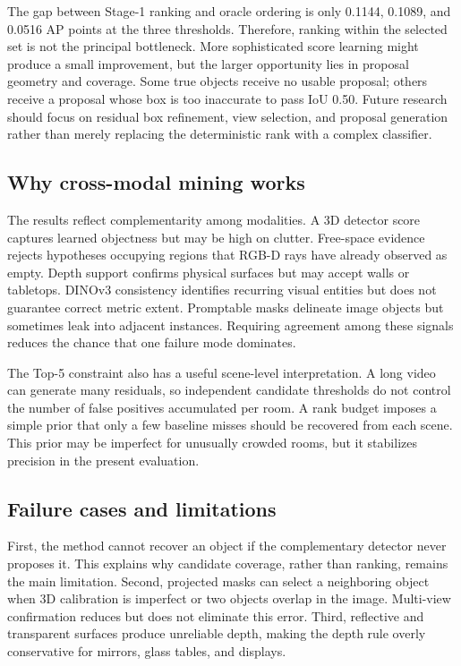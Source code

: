 \documentclass[11pt,a4paper]{article}
\begin{document}
The gap between Stage-1 ranking and oracle ordering is only 0.1144, 0.1089, and 0.0516 AP points at the three thresholds. Therefore, ranking within the selected set is not the principal bottleneck. More sophisticated score learning might produce a small improvement, but the larger opportunity lies in proposal geometry and coverage. Some true objects receive no usable proposal; others receive a proposal whose box is too inaccurate to pass IoU 0.50. Future research should focus on residual box refinement, view selection, and proposal generation rather than merely replacing the deterministic rank with a complex classifier.

\subsection{Why cross-modal mining works}
The results reflect complementarity among modalities. A 3D detector score captures learned objectness but may be high on clutter. Free-space evidence rejects hypotheses occupying regions that RGB-D rays have already observed as empty. Depth support confirms physical surfaces but may accept walls or tabletops. DINOv3 consistency identifies recurring visual entities but does not guarantee correct metric extent. Promptable masks delineate image objects but sometimes leak into adjacent instances. Requiring agreement among these signals reduces the chance that one failure mode dominates.

The Top-5 constraint also has a useful scene-level interpretation. A long video can generate many residuals, so independent candidate thresholds do not control the number of false positives accumulated per room. A rank budget imposes a simple prior that only a few baseline misses should be recovered from each scene. This prior may be imperfect for unusually crowded rooms, but it stabilizes precision in the present evaluation.

\subsection{Failure cases and limitations}
First, the method cannot recover an object if the complementary detector never proposes it. This explains why candidate coverage, rather than ranking, remains the main limitation. Second, projected masks can select a neighboring object when 3D calibration is imperfect or two objects overlap in the image. Multi-view confirmation reduces but does not eliminate this error. Third, reflective and transparent surfaces produce unreliable depth, making the depth rule overly conservative for mirrors, glass tables, and displays.
\end{document}
